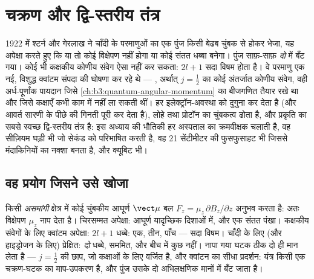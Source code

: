 \chapter{चक्रण और द्वि-स्तरीय तंत्र}\label{ch:b3:spin-two-level}

1922 में श्टर्न और गेरलाख ने चाँदी के परमाणुओं का एक पुंज किसी बेढब
चुंबक से होकर भेजा, यह अपेक्षा करते हुए कि या तो कोई विक्षेपण नहीं होगा
या कोई संतत धब्बा बनेगा। पुंज साफ़-साफ़ \emph{दो} में बँट गया। कोई भी
कक्षकीय कोणीय संवेग ऐसा नहीं कर सकता: $2l + 1$ सदा विषम होता है। वे
परमाणु एक नई, विशुद्ध क्वांटम संपदा की घोषणा कर रहे थे ---
\emph{}, अर्थात् $j = \tfrac12$ का कोई अंतर्जात कोणीय संवेग, वही
अर्ध-पूर्णांक पायदान जिसे \cref{ch:b3:quantum-angular-momentum} का
बीजगणित तैयार रखे था और जिसे कक्षाएँ कभी काम में नहीं ला सकती थीं।
 हर इलेक्ट्रॉन-अवस्था को दुगुना कर देता है (और आवर्त सारणी के
पीछे की गिनती पूरी कर देता है), लोहे तथा प्रोटॉन का चुंबकत्व ढोता है,
और प्रकृति का सबसे स्वच्छ द्वि-स्तरीय तंत्र है: इस अध्याय की भौतिकी
हर अस्पताल का 
क्रमवीक्षक चलाती है, वह सीज़ियम घड़ी भी जो सेकंड को परिभाषित करती है,
वह 21 सेंटीमीटर की फुसफुसाहट भी जिससे मंदाकिनियों का नक्शा बनता है, और क्यूबिट भी।

\section{वह प्रयोग जिसने उसे खोजा}

\begin{example}[श्टर्न--गेरलाख]\label{ex:b3:spin-two-level:stern-gerlach}
किसी \emph{असमांगी} क्षेत्र में कोई चुंबकीय आघूर्ण $\vect\mu$
बल $F_z = \mu_z\,\partial B_z/\partial z$ अनुभव करता है: अतः विक्षेपण
$\mu_z$ नाप देता है। चिरसम्मत अपेक्षा: आघूर्ण यादृच्छिक दिशाओं में,
और एक संतत पंखा। कक्षकीय संवेगों के लिए क्वांटम अपेक्षा: $2l + 1$
धब्बे: एक, तीन, पाँच --- सदा विषम। चाँदी के लिए (और
हाइड्रोजन के लिए) प्रेक्षित: \emph{दो} धब्बे, सममित, और बीच में कुछ
नहीं। नापा गया घटक ठीक दो ही मान लेता है --- $j
= \tfrac12$ की छाप, जो कक्षाओं के लिए वर्जित है, और क्वांटन का सीधा
प्रदर्शन: यंत्र किसी एक चक्रण-घटक का माप-उपकरण है,
और पुंज उसके दो अभिलक्षणिक मानों में बँट जाता है।
\end{example}

